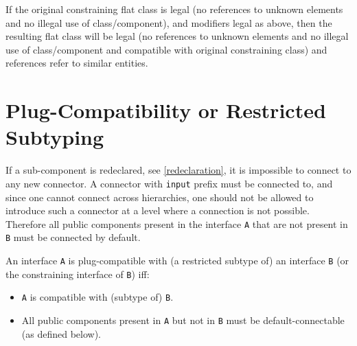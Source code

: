 \begin{nonnormative}
If the original constraining flat class is legal (no references to unknown elements and no illegal use of class/component), and modifiers legal as above, then the resulting flat class will be legal
(no references to unknown elements and no illegal use of class/component and compatible with original constraining class) and references refer to similar entities.
\end{nonnormative}

\section{Plug-Compatibility or Restricted Subtyping}\label{plug-compatibility-or-restricted-subtyping}

\begin{nonnormative}
If a sub-component is redeclared, see \cref{redeclaration}, it is impossible to connect to any new connector.  A connector with \lstinline!input! prefix must be connected to, and since one cannot connect across hierarchies, one should not be allowed to introduce such a connector at a level where a connection is not possible.  Therefore all public components present in the interface \lstinline!A! that are not present in \lstinline!B! must be connected by default.
\end{nonnormative}

\begin{definition}[Plug-compatibility (= restricted subtyping)]%
%
An interface \lstinline!A! is plug-compatible with (a restricted subtype of) an
interface \lstinline!B! (or the constraining interface of \lstinline!B!) iff:
\begin{itemize}
\item
  \lstinline!A! is compatible with (subtype of) \lstinline!B!.
\item
  All public components present in \lstinline!A! but not in \lstinline!B! must be
  default-connectable (as defined below).
\end{itemize}
\end{definition}

